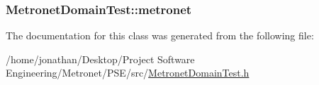\subsubsection[{\texorpdfstring{metronet}{metronet}}]{ Metronet\+Domain\+Test\+::metronet\hspace{0.3cm}{\ttfamily [protected]}}\hypertarget{class_metronet_domain_test_aa185f99af6607124a6fea8c4f63fddb7}{}\label{class_metronet_domain_test_aa185f99af6607124a6fea8c4f63fddb7}


The documentation for this class was generated from the following file\+:\begin{DoxyCompactItemize}
\item 
/home/jonathan/\+Desktop/\+Project Software Engineering/\+Metronet/\+P\+S\+E/src/\hyperlink{_metronet_domain_test_8h}{Metronet\+Domain\+Test.\+h}\end{DoxyCompactItemize}

